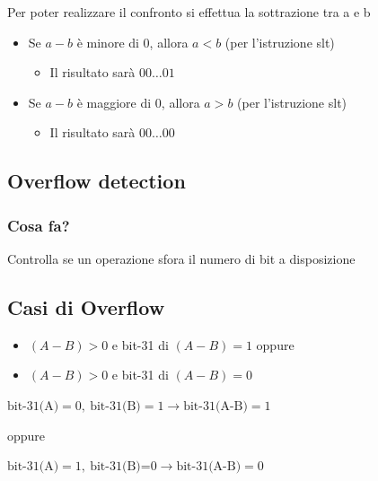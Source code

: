 \vspace{0.2cm}

Per poter realizzare il confronto si effettua la sottrazione tra a e b
\begin{itemize}
    \item Se $a-b$ è minore di $0$, allora $a<b$ (per l'istruzione slt)
    \begin{itemize}
        \item Il risultato sarà $00\dots01$
    \end{itemize}
    \item Se $a-b$ è maggiore di $0$, allora $a>b$ (per l'istruzione slt)
    \begin{itemize}
        \item Il risultato sarà $00\dots00$
    \end{itemize}
\end{itemize}

\subsection{Overflow detection}
\subsubsection{Cosa fa?}
Controlla se un operazione sfora il numero di bit a disposizione

\subsection{Casi di Overflow}
\begin{itemize}
    \item $(A-B)>0$ e bit-31 di $(A-B)=1$ oppure
    \item $(A-B)>0$ e bit-31 di $(A-B)=0$
\end{itemize}

\vspace{0.3cm}

\begin{center}
    \begin{tcolorbox}[width=0.65\textwidth]
        \begin{center}
            $\text{bit-31(A)}=0, \ \text{bit-31(B)}=1 \to  \text{bit-31(A-B)}=1$
            
            \vspace{0.3cm}

            oppure

            \vspace{0.3cm}

            $\text{bit-31(A)}=1,\ \text{bit-31(B)=0} \to \text{bit-31(A-B)}=0$
        \end{center}
    \end{tcolorbox}
\end{center}

